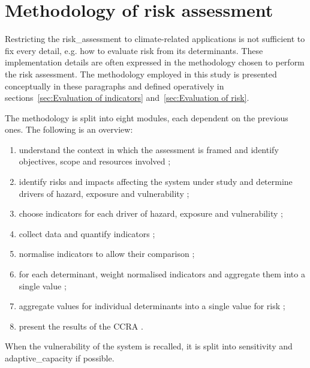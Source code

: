 \section{Methodology of risk assessment}
\label{sec:Methodology of risk assessment}
Restricting the \gls{risk_assessment} to climate-related applications is not sufficient to fix every detail, e.g. how to evaluate \gls{risk} from its \glspl{determinant}. These implementation details are often expressed in the methodology chosen to perform the risk assessment.
The methodology employed in this study is presented conceptually in these paragraphs and defined operatively in sections~\ref{sec:Evaluation of indicators} and~\ref{sec:Evaluation of risk}.

The methodology is split into eight modules, each dependent on the previous ones. The following is an overview:
\begin{enumerate}
  \item \label{itm:module_1} understand the context in which the assessment is framed and identify objectives, scope and resources involved \cite[39-53]{2017GIZTheVulnerability};
  \item \label{itm:module_2} identify \glspl{risk} and \glspl{impact} affecting the system under study and determine \glspl{driver} of \gls{hazard}, \gls{exposure} and \gls{vulnerability} \cite[26-41]{2017GIZRiskSupplement};
  \item \label{itm:module_3} choose \glspl{indicator} for each \gls{driver} of \gls{hazard}, \gls{exposure} and \gls{vulnerability} \cite[73-84]{2017GIZTheVulnerability};
  \item \label{itm:module_4} collect data and quantify \glspl{indicator} \cite[87-103]{2017GIZTheVulnerability};
  \item \label{itm:module_5} normalise \glspl{indicator} to allow their comparison \cite[105-119]{2017GIZTheVulnerability};
  \item \label{itm:module_6} for each \gls{determinant}, weight normalised \glspl{indicator} and aggregate them into a single value \cite[121-131]{2017GIZTheVulnerability};
  \item \label{itm:module_7} aggregate values for individual \glspl{determinant} into a single value for \gls{risk} \cite[133-141]{2017GIZTheVulnerability};
  \item \label{itm:module_8} present the results of the \gls{CCRA} \cite[143-154]{2017GIZTheVulnerability}.
\end{enumerate}
When the \gls{vulnerability} of the system is recalled, it is split into \gls{sensitivity} and \gls{adaptive_capacity} if possible.

